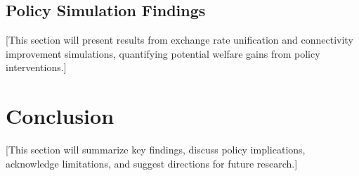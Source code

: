 \documentclass[12pt]{article}
\begin{document}
\subsection{Policy Simulation Findings}
[This section will present results from exchange rate unification and connectivity improvement simulations, quantifying potential welfare gains from policy interventions.]

\section{Conclusion}
[This section will summarize key findings, discuss policy implications, acknowledge limitations, and suggest directions for future research.]

\printbibliography
\end{document}
